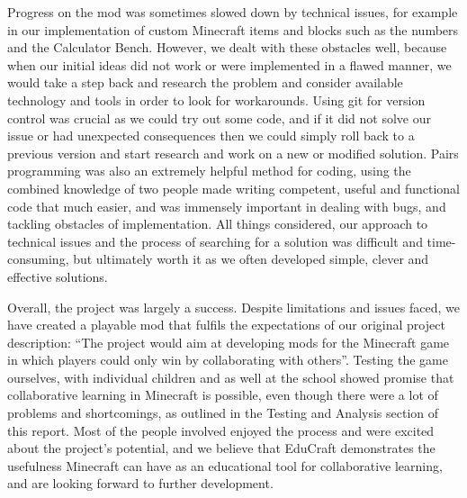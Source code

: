 Progress on the mod was sometimes slowed down by technical issues, for example in our 
implementation of custom Minecraft items and blocks such as the numbers and the 
Calculator Bench. However, we dealt with these obstacles well, because when our initial 
ideas did not work or were implemented in a flawed manner, we would take a step back and 
research the problem and consider available technology and tools in order to look for 
workarounds. Using git for version control was crucial as we could try out some code, and if it did not solve our issue or had unexpected consequences then we could simply roll back to a previous version and start research and work on a new or modified solution. Pairs 
programming was also an extremely helpful method for coding, using the combined 
knowledge of two people made writing competent, useful and functional code that much 
easier, and was immensely important in dealing with bugs, and tackling obstacles of 
implementation. All things considered, our approach to technical issues and the process of 
searching for a solution was difficult and time-consuming, but ultimately worth it as we often developed simple, clever and effective solutions.\newline

Overall, the project was largely a success. Despite limitations and issues faced, we have 
created a playable mod that fulfils the expectations of our original project description: ``The project would aim at developing mods for the Minecraft game in which players could only win by collaborating with others''. Testing the game ourselves, with individual children and as well at the school showed promise that collaborative learning in Minecraft is possible, even though there were a lot of problems and shortcomings, as outlined in the Testing and Analysis section of this report. Most of the people involved enjoyed the process and were excited about the project's potential, and we believe that EduCraft demonstrates the usefulness Minecraft can have as an educational tool for collaborative learning, and are looking forward to further development.
